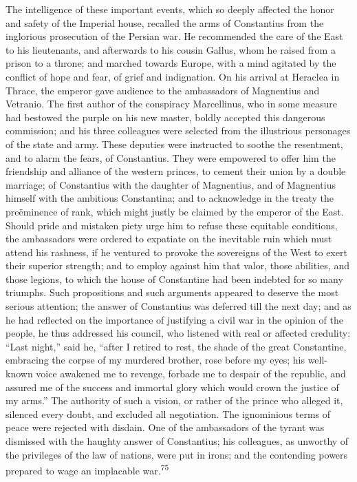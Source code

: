 The intelligence of these important events, which so deeply
affected the honor and safety of the Imperial house, recalled the
arms of Constantius from the inglorious prosecution of the
Persian war. He recommended the care of the East to his
lieutenants, and afterwards to his cousin Gallus, whom he raised
from a prison to a throne; and marched towards Europe, with a
mind agitated by the conflict of hope and fear, of grief and
indignation. On his arrival at Heraclea in Thrace, the emperor
gave audience to the ambassadors of Magnentius and Vetranio. The
first author of the conspiracy Marcellinus, who in some measure
had bestowed the purple on his new master, boldly accepted this
dangerous commission; and his three colleagues were selected from
the illustrious personages of the state and army. These deputies
were instructed to soothe the resentment, and to alarm the fears,
of Constantius. They were empowered to offer him the friendship
and alliance of the western princes, to cement their union by a
double marriage; of Constantius with the daughter of Magnentius,
and of Magnentius himself with the ambitious Constantina; and to
acknowledge in the treaty the preëminence of rank, which might
justly be claimed by the emperor of the East. Should pride and
mistaken piety urge him to refuse these equitable conditions, the
ambassadors were ordered to expatiate on the inevitable ruin
which must attend his rashness, if he ventured to provoke the
sovereigns of the West to exert their superior strength; and to
employ against him that valor, those abilities, and those
legions, to which the house of Constantine had been indebted for
so many triumphs. Such propositions and such arguments appeared
to deserve the most serious attention; the answer of Constantius
was deferred till the next day; and as he had reflected on the
importance of justifying a civil war in the opinion of the
people, he thus addressed his council, who listened with real or
affected credulity: “Last night,” said he, “after I retired to
rest, the shade of the great Constantine, embracing the corpse of
my murdered brother, rose before my eyes; his well-known voice
awakened me to revenge, forbade me to despair of the republic,
and assured me of the success and immortal glory which would
crown the justice of my arms.” The authority of such a vision, or
rather of the prince who alleged it, silenced every doubt, and
excluded all negotiation. The ignominious terms of peace were
rejected with disdain. One of the ambassadors of the tyrant was
dismissed with the haughty answer of Constantius; his colleagues,
as unworthy of the privileges of the law of nations, were put in
irons; and the contending powers prepared to wage an implacable
war.\textsuperscript{75}

